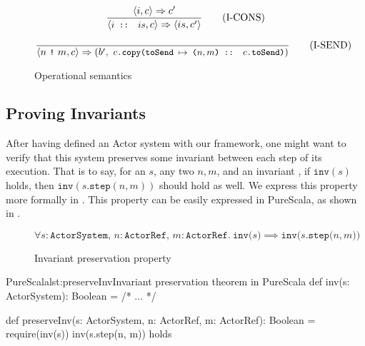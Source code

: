 \begin{figure}[!h]
\begin{framed}
\vspace{10pt}
\begin{equation}
\dfrac{
  \langle i, c \rangle \Rightarrow c'
}{
  \langle \texttt{\small{$i$ :: $is$}}, c \rangle \Rightarrow \langle is, c' \rangle
}
\tag{I-CONS}
\end{equation}

\vspace{10pt}
\begin{equation}
\dfrac{\empty}{
   \langle n\ \stt{!}\ m, c \rangle \Rightarrow (b',\ \stt{$c$.copy(toSend $\mapsto$ ($n, m$) :: $c$.toSend)})
}
\tag{I-SEND}
\end{equation}

\end{framed}
\vspace{-10pt}
\caption{Operational semantics\label{fig:opsem}}
\end{figure}

\subsection{Proving Invariants}
\label{invariants}

After having defined an Actor system with our framework, one might want to verify that this 
system preserves some invariant between each step of its execution. That is to say, 
for an  $s$, any two \ActorRef $n, m$,
and an invariant , if $\texttt{inv}(s)$ holds, 
then $\texttt{inv}(s\texttt{.step}(n, m))$ should hold as well. We express this 
property more formally in . This property can be easily expressed in PureScala, as shown in .

\begin{figure}[!h]
$$\forall s: \texttt{ActorSystem},\, n: \texttt{ActorRef},\, m: \texttt{ActorRef}.\ \texttt{inv($s$)} \implies \texttt{inv($s$.step($n, m$))}$$
\vspace{-20pt}
\caption{Invariant preservation property\label{fig:stepinvariant}}
\end{figure}

\begin{Code}{PureScala}{lst:preserveInv}{Invariant preservation theorem in PureScala}
def inv(s: ActorSystem): Boolean = {
  /* ... */
}

def preserveInv(s: ActorSystem, n: ActorRef, m: ActorRef): Boolean = {
  require(inv(s))
  inv(s.step(n, m))
} holds
\end{Code}

